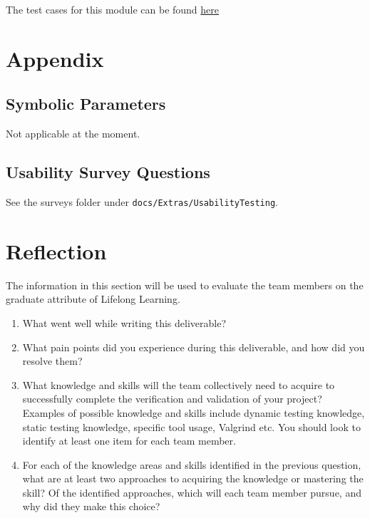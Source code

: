 \documentclass[12pt, titlepage]{article}
\begin{document}
\noindent The test cases for this module can be found \href{https://github.com/ssm-lab/capstone--sco-vs-code-plugin/blob/plugin-multi-file/test/ui/lineSelection.test.ts}{here}




\newpage

\begin{appendices}

\section{Appendix}


\subsection{Symbolic Parameters}

Not applicable at the moment.

\subsection{Usability Survey Questions} \label{A.2}

See the surveys folder under \texttt{docs/Extras/UsabilityTesting}.

\newpage{}
\section{Reflection}


The information in this section will be used to evaluate the team members on the
graduate attribute of Lifelong Learning.



\begin{enumerate}
  \item What went well while writing this deliverable? 
  \item What pain points did you experience during this deliverable, and how
    did you resolve them?
  \item What knowledge and skills will the team collectively need to acquire to
  successfully complete the verification and validation of your project?
  Examples of possible knowledge and skills include dynamic testing knowledge,
  static testing knowledge, specific tool usage, Valgrind etc.  You should look to
  identify at least one item for each team member.
  \item For each of the knowledge areas and skills identified in the previous
  question, what are at least two approaches to acquiring the knowledge or
  mastering the skill?  Of the identified approaches, which will each team
  member pursue, and why did they make this choice?
\end{enumerate}


\end{appendices}
\end{document}
